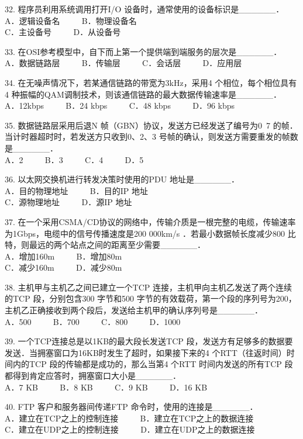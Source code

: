 32. 程序员利用系统调用打开I/O 设备时，通常使用的设备标识是______． \\
A．逻辑设备名 $\qquad$ B．物理设备名 \\
C．主设备号 $\qquad$ D．从设备号

33. 在OSI参考模型中，自下而上第一个提供端到端服务的层次是______． \\
A．数据链路层 $\qquad$ B．传输层 $\qquad$ C．会话层 $\qquad$ D．应用层

34. 在无噪声情况下，若某通信链路的带宽为3kHz，采用4 个相位，每个相位具有4 种振幅的QAM调制技术，则该通信链路的最大数据传输速率是______． \\
A．12kbps $\qquad$ B．24 kbps $\qquad$ C．48 kbps $\qquad$ D．96 kbps

35. 数据链路层采用后退N 帧（GBN）协议，发送方已经发送了编号为0~7 的帧．当计时器超时时，若发送方只收到0、2、3 号帧的确认，则发送方需要重发的帧数是______． \\
A．2 $\qquad$ B．3 $\qquad$ C．4 $\qquad$ D．5

36. 以太网交换机进行转发决策时使用的PDU 地址是______． \\
A．目的物理地址 $\qquad$ B．目的IP 地址 \\
C．源物理地址 $\qquad$ D．源IP 地址

37. 在一个采用CSMA/CD协议的网络中，传输介质是一根完整的电缆，传输速率为1Gbps，电缆中的信号传播速度是200 000km/s ．若最小数据帧长度减少800 比特，则最远的两个站点之间的距离至少需要______． \\
A．增加160m $\qquad$ B．增加80m \\
C．减少160m $\qquad$ D．减少80m

38. 主机甲与主机乙之间已建立一个TCP 连接，主机甲向主机乙发送了两个连续的TCP 段，分别包含300 字节和500 字节的有效载荷，第一个段的序列号为200，主机乙正确接收到两个段后，发送给主机甲的确认序列号是______． \\
A．500 $\qquad$ B．700 $\qquad$ C．800 $\qquad$ D．1000

39. 一个TCP连接总是以1KB的最大段长发送TCP 段，发送方有足够多的数据要发送．当拥塞窗口为16KB时发生了超时，如果接下来的4 个RTT（往返时间）时间内的TCP 段的传输都是成功的，那么当第4 个RTT 时间内发送的所有TCP 段都得到肯定应答时，拥塞窗口大小是______． \\
A．7 KB $\qquad$ B．8 KB $\qquad$ C．9 KB $\qquad$ D．16 KB

40. FTP 客户和服务器间传递FTP 命令时，使用的连接是______． \\
A．建立在TCP之上的控制连接 $\qquad$ B．建立在TCP之上的数据连接 \\
C．建立在UDP之上的控制连接 $\qquad$ D．建立在UDP之上的数据连接

